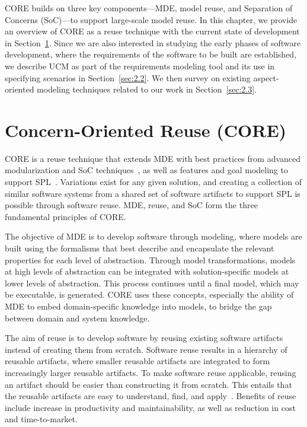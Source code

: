 
CORE builds on three key components---MDE, model reuse, and Separation of Concerns (SoC)---to support large-scale model reuse. In this chapter, we provide an overview of CORE as a reuse technique with the current state of development in Section~\ref{sec:2.1}. Since we are also interested in studying the early phases of software development, where the requirements of the software to be built are established, we describe UCM as part of the requirements modeling tool and its use in specifying scenarios in Section~\ref{sec:2.2}. We then survey on existing aspect-oriented modeling techniques related to our work in Section~\ref{sec:2.3}.

\section{Concern-Oriented Reuse (CORE)} \label{sec:2.1}

CORE is a reuse technique that extends MDE with best practices from advanced modularization and SoC techniques~\cite{dijkstra1976discipline}, as well as features and goal modeling to support SPL~\cite{pohl2005software}. Variations exist for any given solution, and creating a collection of similar software systems from a shared set of software artifacts to support SPL is possible through software reuse. MDE, reuse, and SoC form the three fundamental principles of CORE.

The objective of MDE is to develop software through modeling, where models are built using the formalisms that best describe and encapsulate the relevant properties for each level of abstraction. Through model transformations, models at high levels of abstraction can be integrated with solution-specific models at lower levels of abstraction. This process continues until a final model, which may be executable, is generated. CORE uses these concepts, especially the ability of MDE to embed domain-specific knowledge into models, to bridge the gap between domain and system knowledge.

The aim of reuse is to develop software by reusing existing software artifacts instead of creating them from scratch. Software reuse results in a hierarchy of reusable artifacts, where smaller reusable artifacts are integrated to form increasingly larger reusable artifacts. To make software reuse applicable, reusing an artifact should be easier than constructing it from scratch. This entails that the reusable artifacts are easy to understand, find, and apply~\cite{coulange2012software, krueger1992software}. Benefits of reuse include increase in productivity and maintainability, as well as reduction in cost and time-to-market.

